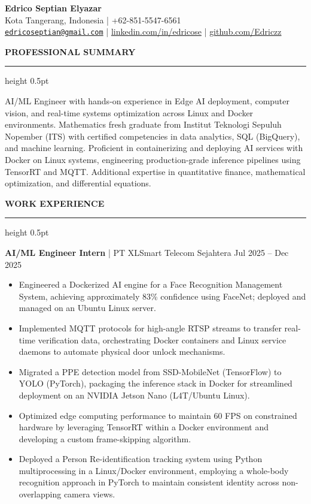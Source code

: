 \documentclass[11pt, letterpaper]{article}
\newcommand{\cvsection}[1]{%
    \vspace{0.8em}%
    {\large \textbf{\MakeUppercase{#1}}}%
    \vspace{0.2em}%
    \hrule height 0.5pt%
    \vspace{0.4em}%
}
\begin{document}
\begin{center}
    {\Huge \textbf{Edrico Septian Elyazar}} \\ \vspace{0.3em}
    Kota Tangerang, Indonesia | +62-851-5547-6561 \\ \vspace{0.3em}
    \href{mailto:edricoseptian@gmail.com}{\nolinkurl{edricoseptian@gmail.com}} |
    \href{https://linkedin.com/in/edricose}{linkedin.com/in/edricose} |
    \href{https://github.com/Edriczz}{github.com/Edriczz}
\end{center}

\cvsection{Professional Summary}
AI/ML Engineer with hands-on experience in Edge AI deployment, computer vision, and real-time systems optimization across Linux and Docker environments. Mathematics fresh graduate from Institut Teknologi Sepuluh Nopember (ITS) with certified competencies in data analytics, SQL (BigQuery), and machine learning. Proficient in containerizing and deploying AI services with Docker on Linux systems, engineering production-grade inference pipelines using TensorRT and MQTT. Additional expertise in quantitative finance, mathematical optimization, and differential equations.

\cvsection{Work Experience}
\textbf{AI/ML Engineer Intern} | PT XLSmart Telecom Sejahtera \hfill Jul 2025 -- Dec 2025
\begin{itemize}[leftmargin=*, nosep]
    \item Engineered a Dockerized AI engine for a Face Recognition Management System, achieving approximately 83\% confidence using FaceNet; deployed and managed on an Ubuntu Linux server.
    \item Implemented MQTT protocols for high-angle RTSP streams to transfer real-time verification data, orchestrating Docker containers and Linux service daemons to automate physical door unlock mechanisms.
    \item Migrated a PPE detection model from SSD-MobileNet (TensorFlow) to YOLO (PyTorch), packaging the inference stack in Docker for streamlined deployment on an NVIDIA Jetson Nano (L4T/Ubuntu Linux).
    \item Optimized edge computing performance to maintain 60 FPS on constrained hardware by leveraging TensorRT within a Docker environment and developing a custom frame-skipping algorithm.
    \item Deployed a Person Re-identification tracking system using Python multiprocessing in a Linux/Docker environment, employing a whole-body recognition approach in PyTorch to maintain consistent identity across non-overlapping camera views.
\end{itemize}
\end{document}

